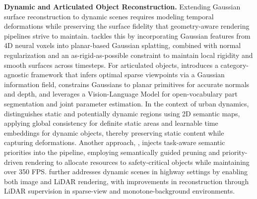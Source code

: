 \documentclass[11pt]{article}
\begin{document}
\textbf{Dynamic and Articulated Object Reconstruction.} Extending Gaussian surface reconstruction to dynamic scenes requires modeling temporal deformations while preserving the surface fidelity that geometry-aware rendering pipelines strive to maintain. \cite{ref230} tackles this by incorporating Gaussian features from 4D neural voxels into planar-based Gaussian splatting, combined with normal regularization and an as-rigid-as-possible constraint to maintain local rigidity and smooth surfaces across timesteps. For articulated objects, \cite{ref231} introduces a category-agnostic framework that infers optimal sparse viewpoints via a Gaussian information field, constrains Gaussians to planar primitives for accurate normals and depth, and leverages a Vision-Language Model for open-vocabulary part segmentation and joint parameter estimation. In the context of urban dynamics, \cite{ref232} distinguishes static and potentially dynamic regions using 2D semantic maps, applying global consistency for definite static areas and learnable time embeddings for dynamic objects, thereby preserving static content while capturing deformations. Another approach, \cite{ref233}, injects task-aware semantic priorities into the pipeline, employing semantically guided pruning and priority-driven rendering to allocate resources to safety-critical objects while maintaining over 350 FPS. \cite{ref234} further addresses dynamic scenes in highway settings by enabling both image and LiDAR rendering, with improvements in reconstruction through LiDAR supervision in sparse-view and monotone-background environments.
\end{document}
